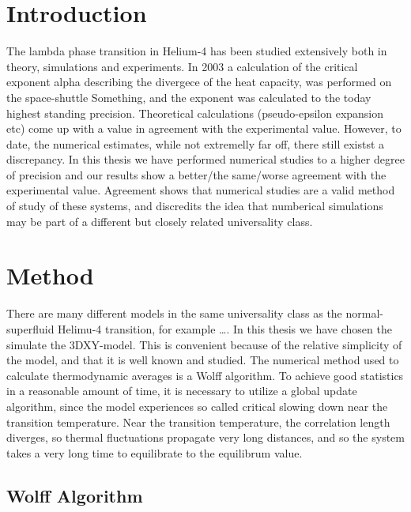 \documentclass[a4paper]{article}
\begin{document}
\section{Introduction}
The lambda phase transition in Helium-4 has been studied extensively both in theory, simulations and experiments. In 2003 a calculation of the critical exponent alpha describing the divergece of the heat capacity, was performed on the space-shuttle Something, and the exponent was calculated to the today highest standing precision. Theoretical calculations (pseudo-epsilon expansion etc) come up with a value in agreement with the experimental value. However, to date, the numerical estimates, while not extremelly far off, there still existst a discrepancy. In this thesis we have performed numerical studies to a higher degree of precision and our results show a better/the same/worse agreement with the experimental value. Agreement shows that numerical studies are a valid method of study of these systems, and discredits the idea that numberical simulations may be part of a different but closely related universality class.
\section{Method}
There are many different models in the same universality class as the normal-superfluid Helimu-4 transition, for example \dots.
In this thesis we have chosen the simulate the 3DXY-model. This is convenient because of the relative simplicity of the model, and that it is well known and studied.
The numerical method used to calculate thermodynamic averages is a Wolff algorithm.
To achieve good statistics in a reasonable amount of time, it is necessary to utilize a global update algorithm, since the model experiences so called critical slowing down near the transition temperature. 
Near the transition temperature, the correlation length diverges, so thermal fluctuations propagate very long distances, and so the system takes a very long time to equilibrate to the equilibrum value.
\subsection{Wolff Algorithm}
\end{document}
